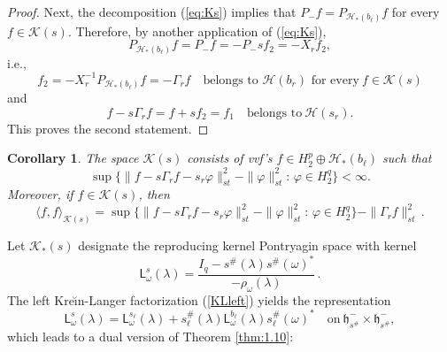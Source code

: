 \documentclass[12pt,twoside,a4paper]{amsart}
\newtheorem{corollary}[thm]{Corollary}
\theoremstyle{definition}
\numberwithin{equation}{section}
\begin{document}
\begin{proof}
Next, the decomposition (\ref{eq:Ks}) implies that $P_-f=P_{{{\mathcal H}}_*(b_\ell)}f$
for every $f\in{{\mathcal K}}(s)$. Therefore, by another application of  (\ref{eq:Ks}),
\[
P_{{{\mathcal H}}_*(b_\ell)}f=P_-f=-P_-sf_2=-X_rf_2,
\]
i.e.,
$$
f_2=-X_r^{-1}P_{{{\mathcal H}}_*(b_\ell)}f=-\Gamma_r f\quad
\textrm{belongs to ${{\mathcal H}}(b_r)$  for every}\ f\in{{\mathcal K}}(s)
$$
and
\[
    f-s\Gamma_r f=f+sf_2=f_1\quad \textrm{belongs to}\  {{\mathcal H}}(s_r).
\]
This proves the second statement.
\end{proof}

\begin{corollary}
The space ${{\mathcal K}}(s)$ consists of vvf's $f\in H^p_2\oplus{{\mathcal H}}_*(b_\ell)$
such that
\begin{equation}\label{eq:1.11}
\sup\{\|f-s\Gamma_r
f-s_r\varphi\|^2_{st}-\|\varphi\|^2_{st}:\,\varphi\in
H_2^q\}<\infty.
\end{equation}
Moreover,  if $f\in{{\mathcal K}}(s)$, then
\begin{equation}
\label{eq:jul3a7} \langle f,f\rangle_{{{\mathcal K}}(s)}=\sup\{\|f-s\Gamma_r
f-s_r\varphi\|^2_{st}-\|\varphi\|^2_{st}:\,\varphi\in
H_2^q\}-\|\Gamma_rf\|^2_{st}\,.
\end{equation}
\end{corollary}

Let ${{\mathcal K}}_*(s)$ designate  the reproducing kernel Pontryagin space with kernel
$$
{\mathsf  L}^s_\omega(\lambda)
=\frac{I_q-s^\#(\lambda)s^\#(\omega)^*}{-\rho_\omega(\lambda)}\,.
$$
The left Kre\u{\i}n-Langer
factorization (\ref{KLleft}) yields the representation
\begin{equation}\label{eq:1.15}
{\mathsf L}^s_\omega(\lambda)={\mathsf
L}^{s_\ell}_\omega(\lambda)+s^\#_\ell(\lambda){\mathsf
L}^{b_\ell}_\omega(\lambda)s^\#_\ell(\omega)^*
   \quad \text{on} \ {{\mathfrak h}}^-_{s^\#}\times {{\mathfrak h}}^-_{s^\#},
\end{equation}
which leads to a dual version of Theorem \ref{thm:1.10}:
\end{document}
